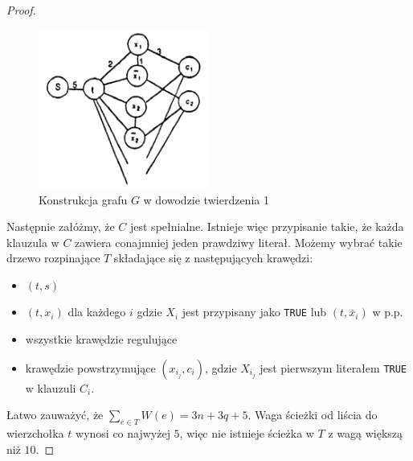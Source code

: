\begin{theorem}
\begin{proof}
        \begin{figure}[h!]
            \centering
            \includegraphics[width=0.5\textwidth]{graph_proof.png}
            \caption{Konstrukcja grafu $G$ w dowodzie twierdzenia 1}
            \label{fig:graph_proof_construct}
        \end{figure}

        Następnie załóżmy, że $C$ jest spełnialne. Istnieje więc przypisanie takie, że każda klauzula w $C$ zawiera conajmniej jeden prawdziwy literał. Możemy wybrać takie drzewo rozpinające $T$ składające się z następujących krawędzi:
        \begin{itemize}
            \item $(t, s)$
            \item $(t, x_i)$ dla każdego $i$ gdzie $X_i$ jest przypisany jako \texttt{TRUE} lub $(t, \bar{x}_i)$ w p.p.
            \item wszystkie krawędzie regulujące
            \item krawędzie powstrzymujące $(x_{i_j}, c_i)$, gdzie $X_{i_j}$ jest pierwszym literałem \texttt{TRUE} w klauzuli $C_i$.
        \end{itemize}
        Łatwo zauważyć, że $\sum_{e\in T} W(e) = 3n + 3q + 5$. Waga ścieżki od liścia do wierzchołka $t$ wynosi co najwyżej $5$, więc nie istnieje ścieżka w $T$ z wagą większą niż $10$.


\end{proof}
\end{theorem}
